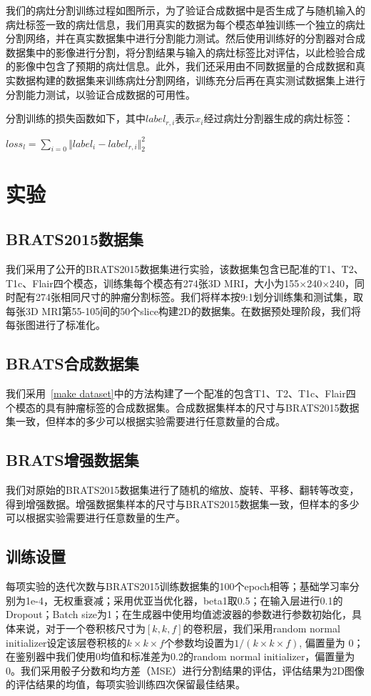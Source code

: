\documentclass[letterpaper]{article} %
\begin{document}
我们的病灶分割训练过程如图所示，为了验证合成数据中是否生成了与随机输入的病灶标签一致的病灶信息，我们用真实的数据为每个模态单独训练一个独立的病灶分割网络，并在真实数据集中进行分割能力测试。然后使用训练好的分割器对合成数据集中的影像进行分割，将分割结果与输入的病灶标签比对评估，以此检验合成的影像中包含了预期的病灶信息。此外，我们还采用由不同数据量的合成数据和真实数据构建的数据集来训练病灶分割网络，训练充分后再在真实测试数据集上进行分割能力测试，以验证合成数据的可用性。

分割训练的损失函数如下，其中$label_{r,i}$表示$x_i$经过病灶分割器生成的病灶标签：
\begin{center}
		$loss_{l}=\sum\limits_{i=0}\Vert{label_i-label_{r,i}}\Vert_{2}^{2}$
\end{center}


\section{实验}

\subsection{BRATS2015数据集}
我们采用了公开的BRATS2015\cite{91menze:hal-00935640}数据集进行实验，该数据集包含已配准的T1、T2、T1c、Flair四个模态，训练集每个模态有274张3D MRI，大小为155$\times$240$\times$240，同时配有274张相同尺寸的肿瘤分割标签。我们将样本按9:1划分训练集和测试集，取每张3D MRI第55-105间的50个slice构建2D的数据集。在数据预处理阶段，我们将每张图进行了标准化。

\subsection{BRATS合成数据集}
我们采用~\ref{make dataset}中的方法构建了一个配准的包含T1、T2、T1c、Flair四个模态的具有肿瘤标签的合成数据集。合成数据集样本的尺寸与BRATS2015数据集一致，但样本的多少可以根据实验需要进行任意数量的合成。

\subsection{BRATS增强数据集}
我们对原始的BRATS2015数据集进行了随机的缩放、旋转、平移、翻转等改变，得到增强数据。增强数据集样本的尺寸与BRATS2015数据集一致，但样本的多少可以根据实验需要进行任意数量的生产。

\subsection{训练设置}
每项实验的迭代次数与BRATS2015训练数据集的100个epoch相等；基础学习率分别为1e-4，无权重衰减；采用优亚当优化器，beta1取0.5；在输入层进行0.1的Dropout；Batch size为1；在生成器中使用均值滤波器的参数进行参数初始化，具体来说，对于一个卷积核尺寸为$[k,k,f]$的卷积层，我们采用random normal initializer设定该层卷积核的$k\times k\times f$个参数均设置为$1/(k\times k\times f)$, 偏置量为 0；在鉴别器中我们使用0均值和标准差为0.2的random normal initializer，偏置量为0。我们采用骰子分数\cite{95dice1945measures}和均方差（MSE）\cite{94prasad1990the}进行分割结果的评估，评估结果为2D图像的评估结果的均值，每项实验训练四次保留最佳结果。
\end{document}
